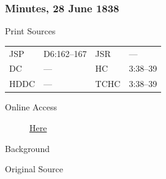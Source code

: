 		\subsubsection{Minutes, 28 June 1838}
			\label{EMS-1838-JS-28-JUN-1838}
			
			\begin{description}
					\item[Print Sources]
				\end{description}

					\begin{tabular}{p{0.5in}p{1in}p{0.5in}p{1in}}
					JSP	 	& D6:162--167		& JSR 		& --- \\
					DC	 	& ---		& HC 		& 3:38--39 \\
					HDDC 	& ---		& TCHC 		& 3:38--39 \\
					\end{tabular}
				
				\begin{description}
					\item[Online Access] \href{https://www.josephsmithpapers.org/paper-summary/minutes-28-june-1838/1}{Here}
				\end{description}
				
				\begin{description}
					\item[Background]
				\end{description}
				
				
				\begin{description}
					\item[Original Source]
				\end{description}
				
				
